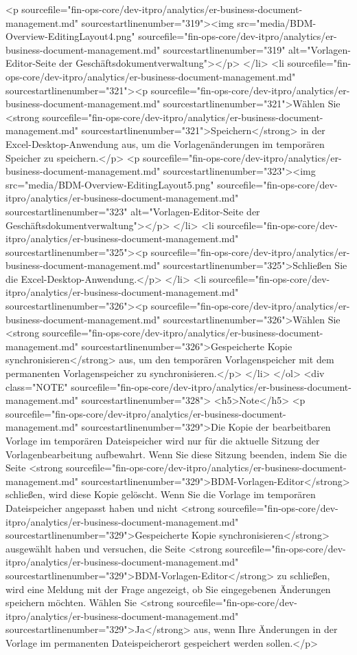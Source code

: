 <p sourcefile="fin-ops-core/dev-itpro/analytics/er-business-document-management.md" sourcestartlinenumber="319"><img src="media/BDM-Overview-EditingLayout4.png" sourcefile="fin-ops-core/dev-itpro/analytics/er-business-document-management.md" sourcestartlinenumber="319" alt="Vorlagen-Editor-Seite der Geschäftsdokumentverwaltung"></p>
</li>
<li sourcefile="fin-ops-core/dev-itpro/analytics/er-business-document-management.md" sourcestartlinenumber="321"><p sourcefile="fin-ops-core/dev-itpro/analytics/er-business-document-management.md" sourcestartlinenumber="321">Wählen Sie <strong sourcefile="fin-ops-core/dev-itpro/analytics/er-business-document-management.md" sourcestartlinenumber="321">Speichern</strong> in der Excel-Desktop-Anwendung aus, um die Vorlagenänderungen im temporären Speicher zu speichern.</p>
<p sourcefile="fin-ops-core/dev-itpro/analytics/er-business-document-management.md" sourcestartlinenumber="323"><img src="media/BDM-Overview-EditingLayout5.png" sourcefile="fin-ops-core/dev-itpro/analytics/er-business-document-management.md" sourcestartlinenumber="323" alt="Vorlagen-Editor-Seite der Geschäftsdokumentverwaltung"></p>
</li>
<li sourcefile="fin-ops-core/dev-itpro/analytics/er-business-document-management.md" sourcestartlinenumber="325"><p sourcefile="fin-ops-core/dev-itpro/analytics/er-business-document-management.md" sourcestartlinenumber="325">Schließen Sie die Excel-Desktop-Anwendung.</p>
</li>
<li sourcefile="fin-ops-core/dev-itpro/analytics/er-business-document-management.md" sourcestartlinenumber="326"><p sourcefile="fin-ops-core/dev-itpro/analytics/er-business-document-management.md" sourcestartlinenumber="326">Wählen Sie <strong sourcefile="fin-ops-core/dev-itpro/analytics/er-business-document-management.md" sourcestartlinenumber="326">Gespeicherte Kopie synchronisieren</strong> aus, um den temporären Vorlagenspeicher mit dem permanenten Vorlagenspeicher zu synchronisieren.</p>
</li>
</ol>
<div class="NOTE" sourcefile="fin-ops-core/dev-itpro/analytics/er-business-document-management.md" sourcestartlinenumber="328">
<h5>Note</h5>
<p sourcefile="fin-ops-core/dev-itpro/analytics/er-business-document-management.md" sourcestartlinenumber="329">Die Kopie der bearbeitbaren Vorlage im temporären Dateispeicher wird nur für die aktuelle Sitzung der Vorlagenbearbeitung aufbewahrt. Wenn Sie diese Sitzung beenden, indem Sie die Seite <strong sourcefile="fin-ops-core/dev-itpro/analytics/er-business-document-management.md" sourcestartlinenumber="329">BDM-Vorlagen-Editor</strong> schließen, wird diese Kopie gelöscht. Wenn Sie die Vorlage im temporären Dateispeicher angepasst haben und nicht <strong sourcefile="fin-ops-core/dev-itpro/analytics/er-business-document-management.md" sourcestartlinenumber="329">Gespeicherte Kopie synchronisieren</strong> ausgewählt haben und versuchen, die Seite <strong sourcefile="fin-ops-core/dev-itpro/analytics/er-business-document-management.md" sourcestartlinenumber="329">BDM-Vorlagen-Editor</strong> zu schließen, wird eine Meldung mit der Frage angezeigt, ob Sie eingegebenen Änderungen speichern möchten. Wählen Sie <strong sourcefile="fin-ops-core/dev-itpro/analytics/er-business-document-management.md" sourcestartlinenumber="329">Ja</strong> aus, wenn Ihre Änderungen in der Vorlage im permanenten Dateispeicherort gespeichert werden sollen.</p>
